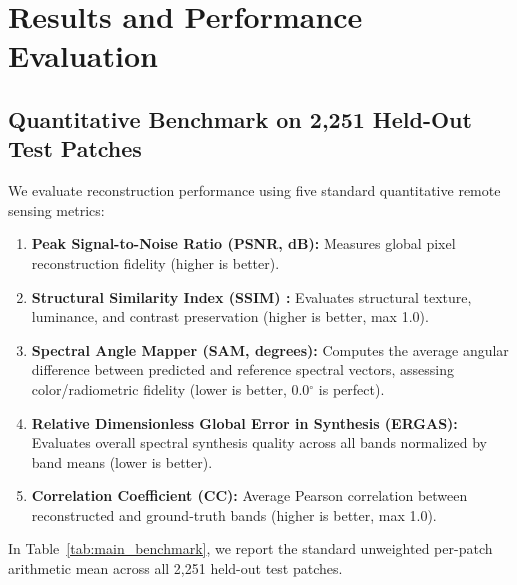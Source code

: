 \section{Results and Performance Evaluation}
\label{sec:results}

\subsection{Quantitative Benchmark on 2,251 Held-Out Test Patches}
We evaluate reconstruction performance using five standard quantitative remote sensing metrics:
\begin{enumerate}
    \item \textbf{Peak Signal-to-Noise Ratio (PSNR, dB):} Measures global pixel reconstruction fidelity (higher is better).
    \item \textbf{Structural Similarity Index (SSIM) \cite{wang2004image}:} Evaluates structural texture, luminance, and contrast preservation (higher is better, max 1.0).
    \item \textbf{Spectral Angle Mapper (SAM, degrees):} Computes the average angular difference between predicted and reference spectral vectors, assessing color/radiometric fidelity (lower is better, 0.0$^\circ$ is perfect).
    \item \textbf{Relative Dimensionless Global Error in Synthesis (ERGAS):} Evaluates overall spectral synthesis quality across all bands normalized by band means (lower is better).
    \item \textbf{Correlation Coefficient (CC):} Average Pearson correlation between reconstructed and ground-truth bands (higher is better, max 1.0).
\end{enumerate}

In Table~\ref{tab:main_benchmark}, we report the standard unweighted per-patch arithmetic mean across all 2,251 held-out test patches.

\begin{table}[!t]
\centering
\caption{Quantitative Reconstruction Performance on 5.0\,m LISS-IV Test Set (2,251 Held-Out Patches, Standard Per-Patch Unweighted Mean).}
\label{tab:main_benchmark}
\end{table}

